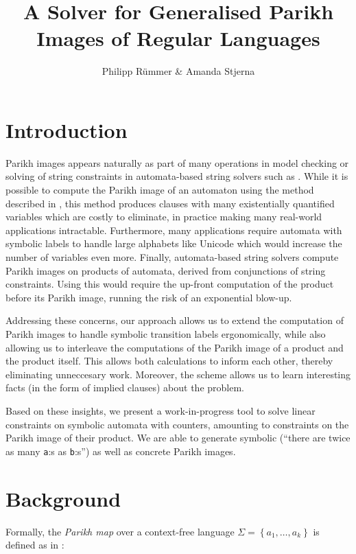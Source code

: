 \documentclass[runningheads]{llncs}
\title{A Solver for Generalised Parikh Images of Regular Languages}
\author{Philipp Rümmer \& Amanda Stjerna}
\institute{Uppsala University, Sweden}
\begin{document}
\maketitle

\section{Introduction}

Parikh images appears naturally as part of many operations in model checking or
solving of string constraints in automata-based string solvers such as
\Ostrich{} \cite{ostrich}. While it is possible to compute the Parikh image of
an automaton using the method described in \cite{generate-parikh-image}, this
method produces clauses with many existentially quantified variables which are
costly to eliminate, in practice making many real-world applications
intractable. Furthermore, many applications require automata with symbolic
labels to handle large alphabets like Unicode which would increase the number of
variables even more. Finally, automata-based string solvers compute Parikh
images on products of automata, derived from conjunctions of string constraints.
Using \cite{generate-parikh-image} this would require the up-front computation
of the product before its Parikh image, running the risk of an exponential
blow-up.

Addressing these concerns, our approach allows us to extend the computation of
Parikh images to handle symbolic transition labels ergonomically, while also
allowing us to interleave the computations of the Parikh image of a product and
the product itself. This allows both calculations to inform each other, thereby
eliminating unneccesary work. Moreover, the scheme allows us to learn
interesting facts (in the form of implied clauses) about the problem.

Based on these insights, we present a work-in-progress tool to solve linear
constraints on symbolic automata with counters, amounting to constraints on the
Parikh image of their product. We are able to generate symbolic (\enquote{there are
twice as many \texttt{a}:s as \texttt{b}:s}) as well as concrete Parikh images.

\section{Background}

Formally, the \textit{Parikh map} over a context-free language $\Sigma = \left\{a_1, \ldots, a_k \right\}$ is defined as in \cite{kozen}:
\end{document}
